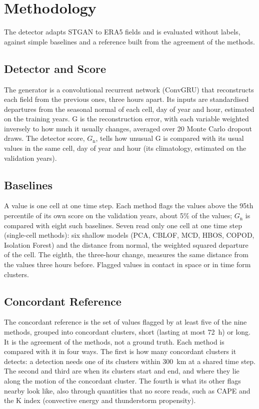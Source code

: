 \documentclass[11pt,a4paper]{article}
\newcommand{\Gn}{$G_{\mathrm{n}}$}
\begin{document}
\section{Methodology}

The detector adapts STGAN to ERA5 fields and is evaluated without labels, against simple baselines and a reference built from the agreement of the methods.

\subsection{Detector and Score}
The generator is a convolutional recurrent network (ConvGRU) that reconstructs each field from the previous ones, three hours apart. Its inputs are standardised departures from the seasonal normal of each cell, day of year and hour, estimated on the training years. G is the reconstruction error, with each variable weighted inversely to how much it usually changes, averaged over 20 Monte Carlo dropout draws. The detector score, \Gn, tells how unusual G is compared with its usual values in the same cell, day of year and hour (its climatology, estimated on the validation years).

\subsection{Baselines}
A value is one cell at one time step. Each method flags the values above the 95th percentile of its own score on the validation years, about 5\% of the values; \Gn{} is compared with eight such baselines. Seven read only one cell at one time step (single-cell methods): six shallow models (PCA, CBLOF, MCD, HBOS, COPOD, Isolation Forest) and the distance from normal, the weighted squared departure of the cell. The eighth, the three-hour change, measures the same distance from the values three hours before. Flagged values in contact in space or in time form clusters.

\subsection{Concordant Reference}
The concordant reference is the set of values flagged by at least five of the nine methods, grouped into concordant clusters, short (lasting at most 72~h) or long. It is the agreement of the methods, not a ground truth. Each method is compared with it in four ways. The first is how many concordant clusters it detects: a detection needs one of its clusters within 300~km at a shared time step. The second and third are when its clusters start and end, and where they lie along the motion of the concordant cluster. The fourth is what its other flags nearby look like, also through quantities that no score reads, such as CAPE and the K index (convective energy and thunderstorm propensity).
\end{document}
